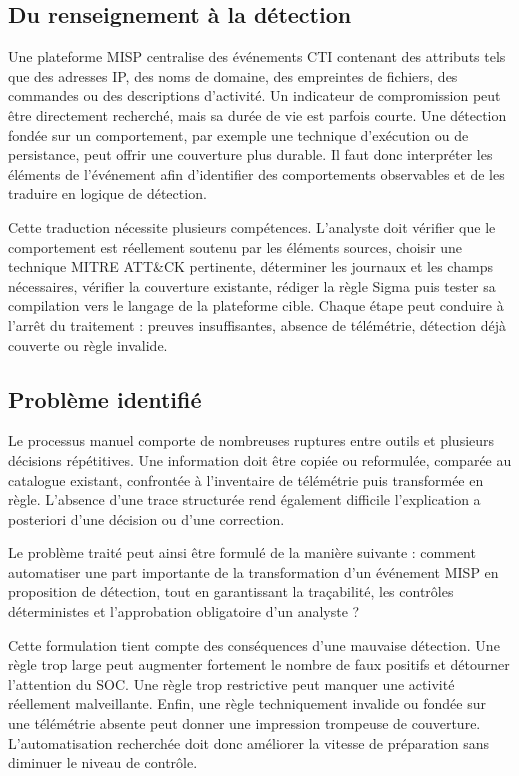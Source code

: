 \subsection{Du renseignement à la détection}

Une plateforme MISP centralise des événements CTI contenant des attributs tels que des adresses IP, des noms de domaine, des empreintes de fichiers, des commandes ou des descriptions d'activité. Un indicateur de compromission peut être directement recherché, mais sa durée de vie est parfois courte. Une détection fondée sur un comportement, par exemple une technique d'exécution ou de persistance, peut offrir une couverture plus durable. Il faut donc interpréter les éléments de l'événement afin d'identifier des comportements observables et de les traduire en logique de détection.

Cette traduction nécessite plusieurs compétences. L'analyste doit vérifier que le comportement est réellement soutenu par les éléments sources, choisir une technique MITRE ATT\&CK pertinente, déterminer les journaux et les champs nécessaires, vérifier la couverture existante, rédiger la règle Sigma puis tester sa compilation vers le langage de la plateforme cible. Chaque étape peut conduire à l'arrêt du traitement : preuves insuffisantes, absence de télémétrie, détection déjà couverte ou règle invalide.

\subsection{Problème identifié}

Le processus manuel comporte de nombreuses ruptures entre outils et plusieurs décisions répétitives. Une information doit être copiée ou reformulée, comparée au catalogue existant, confrontée à l'inventaire de télémétrie puis transformée en règle. L'absence d'une trace structurée rend également difficile l'explication a posteriori d'une décision ou d'une correction.

Le problème traité peut ainsi être formulé de la manière suivante : comment automatiser une part importante de la transformation d'un événement MISP en proposition de détection, tout en garantissant la traçabilité, les contrôles déterministes et l'approbation obligatoire d'un analyste ?

Cette formulation tient compte des conséquences d'une mauvaise détection. Une règle trop large peut augmenter fortement le nombre de faux positifs et détourner l'attention du SOC. Une règle trop restrictive peut manquer une activité réellement malveillante. Enfin, une règle techniquement invalide ou fondée sur une télémétrie absente peut donner une impression trompeuse de couverture. L'automatisation recherchée doit donc améliorer la vitesse de préparation sans diminuer le niveau de contrôle.


